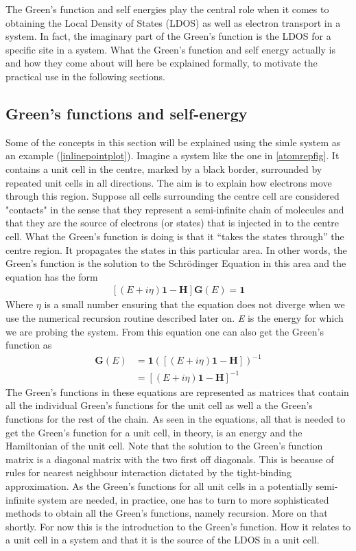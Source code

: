 The Green's function and self energies play the central role when it comes to obtaining the Local Density of States (LDOS) as well as electron transport in a system. In fact, the imaginary part of the Green's function is the LDOS for a specific site in a system. What the Green's function and self energy actually is and how they come about will here be explained formally, to motivate the practical use in the following sections.
\subsection{Green's functions and self-energy}\label{greensandself}
Some of the concepts in this section will be explained using the simle system as an example (\cref{inlinepointplot}). Imagine a system like the one in \cref{atomrepfig}. It contains a unit cell in the centre, marked by a black border, surrounded by repeated unit cells in all directions. The aim is to explain how electrons move through this region. Suppose all cells surrounding the centre cell are considered "contacts" in the sense that they represent a semi-infinite chain of molecules and that they are the source of electrons (or states) that is injected in to the centre cell. What the Green's function is doing is that it ``takes the states through'' the centre region. It propagates the states in this particular area. In other words, the Green's function is the solution to the Schr\"{o}dinger Equation in this area and the equation has the form
\begin{align}\label{Greensunsolved}
	[(E+i\eta)\mathbf{1}-\mathbf{H}]\mathbf{G}(E) = \mathbf{1}
\end{align}
Where \(\eta\) is a small number ensuring that the equation does not diverge when we use the numerical recursion routine described later on. \textit{E} is the energy for which we are probing the system.
From this equation one can also get the Green's function as
\begin{align}\label{Greenssolved}
	\mathbf{G}(E) & = \mathbf{1}([(E+i\eta)\mathbf{1}-\mathbf{H}])^{-1} \\
	              & = [(E+i\eta)\mathbf{1}-\mathbf{H}]^{-1}
\end{align}
The Green's functions in these equations are represented as matrices that contain all the individual Green's functions for the unit cell as well a the Green's functions for the rest of the chain. As seen in the equations, all that is needed to get the Green's function for a unit cell, in theory, is an energy and the Hamiltonian of the unit cell. Note that the solution to the Green's function matrix is a diagonal matrix with the two first off diagonals. This is because of rules for nearest neighbour interaction dictated by the tight-binding approximation. As the Green's functions for all unit cells in a potentially semi-infinite system are needed, in practice, one has to turn to more sophisticated methods to obtain all the Green's functions, namely recursion. More on that shortly. For now this is the introduction to the Green's function. How it relates to a unit cell in a system and that it is the source of the LDOS in a unit cell.\\
